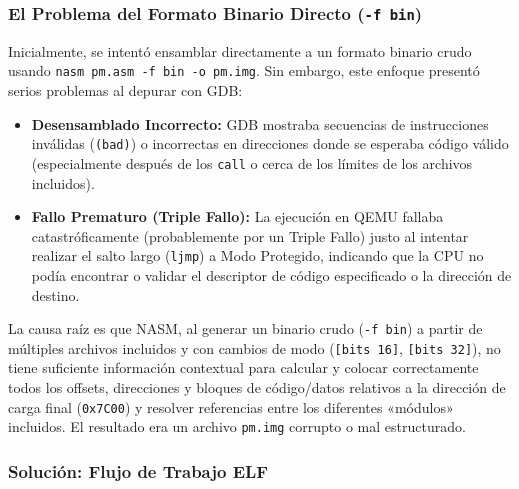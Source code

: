 \subsubsection{El Problema del Formato Binario Directo (\texttt{-f bin})}

Inicialmente, se intentó ensamblar directamente a un formato binario crudo usando \texttt{nasm pm.asm -f bin -o pm.img}. Sin embargo, este enfoque presentó serios problemas al depurar con GDB:
\begin{itemize}
    \item \textbf{Desensamblado Incorrecto:} GDB mostraba secuencias de instrucciones inválidas (\texttt{(bad)}) o incorrectas en direcciones donde se esperaba código válido (especialmente después de los \texttt{call} o cerca de los límites de los archivos incluidos).
    \item \textbf{Fallo Prematuro (Triple Fallo):} La ejecución en QEMU fallaba catastróficamente (probablemente por un Triple Fallo) justo al intentar realizar el salto largo (\texttt{ljmp}) a Modo Protegido, indicando que la CPU no podía encontrar o validar el descriptor de código especificado o la dirección de destino.
\end{itemize}
La causa raíz es que NASM, al generar un binario crudo (\texttt{-f bin}) a partir de múltiples archivos incluidos y con cambios de modo (\texttt{[bits 16]}, \texttt{[bits 32]}), no tiene suficiente información contextual para calcular y colocar correctamente todos los offsets, direcciones y bloques de código/datos relativos a la dirección de carga final (\texttt{0x7C00}) y resolver referencias entre los diferentes «módulos» incluidos. El resultado era un archivo \texttt{pm.img} corrupto o mal estructurado.

\subsubsection{Solución: Flujo de Trabajo ELF}

